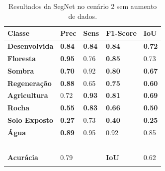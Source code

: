 \documentclass[%
  10pt,%
  aspectratio = 169,%
  compress,%
  t,%
  english,%
  brazilian,%
  tikz,
]{beamer}
\begin{document}
\begin{frame}
\begin{columns}[T]
\begin{table}[!ht]
    \centering
    \caption{Resultados da SegNet no cenário 2 sem aumento de dados.}%
    \label{tab:res:cen22}%
    \begin{tabular}{lllll}
    \toprule
        \textbf{Classe} & \textbf{Prec} & \textbf{Sens} & \textbf{F1-Score} & \textbf{IoU} \\
        \midrule
        \textbf{Desenvolvida}    & \textbf{0.84} & \textbf{0.84} & \textbf{0.84} & \textbf{0.72}  \\ 
        \textbf{Floresta}        & \textbf{0.95} & 0.76 & \textbf{0.85} & 0.73  \\ 
        \textbf{Sombra}          & \textbf{0.70} & 0.92 & \textbf{0.80} & \textbf{0.67}  \\ 
        \textbf{Regeneração}     & \textbf{0.88} & 0.65 & \textbf{0.75} & \textbf{0.60}  \\ 
        \textbf{Agricultura}     & 0.72 & \textbf{0.93} & \textbf{0.81} & \textbf{0.69}  \\ 
        \textbf{Rocha}           & \textbf{0.55} & \textbf{0.83} & \textbf{0.66} & \textbf{0.50}  \\ 
        \textbf{Solo Exposto}    & \textbf{0.27} & 0.73 & \textbf{0.40} & \textbf{0.25}  \\ 
        \textbf{Água}            & \textbf{0.89} & \colorbox{green!25}{0.95} & \colorbox{green!25}{0.92} & \colorbox{green!25}{0.85} \\ 
        \textbf{} & ~ & ~ & ~ & ~ \\ 
        \textbf{Acurácia} & \colorbox{green!25}{0.79} & ~ & \textbf{IoU} & \colorbox{green!25}{0.62} \\
        \bottomrule
        \addlinespace
    \end{tabular}
\end{table}

\end{columns}
\end{frame}
\end{document}
